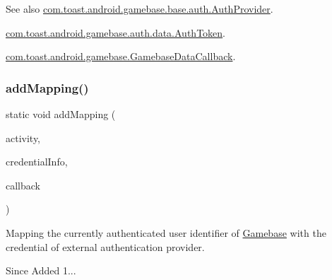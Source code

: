 \begin{DoxySeeAlso}{See also}
\hyperlink{interfacecom_1_1toast_1_1android_1_1gamebase_1_1base_1_1auth_1_1_auth_provider}{com.\+toast.\+android.\+gamebase.\+base.\+auth.\+Auth\+Provider}. 

\hyperlink{classcom_1_1toast_1_1android_1_1gamebase_1_1auth_1_1data_1_1_auth_token}{com.\+toast.\+android.\+gamebase.\+auth.\+data.\+Auth\+Token}. 

\hyperlink{interfacecom_1_1toast_1_1android_1_1gamebase_1_1_gamebase_data_callback}{com.\+toast.\+android.\+gamebase.\+Gamebase\+Data\+Callback}. 
\end{DoxySeeAlso}
\mbox{\label{classcom_1_1toast_1_1android_1_1gamebase_1_1_gamebase_a5152b09c5542e5442ed94f0f541ae1d5}} 
\subsubsection{\texorpdfstring{add\+Mapping()}{addMapping()}\hspace{0.1cm}{\footnotesize\ttfamily [2/3]}}
{\footnotesize\ttfamily static void add\+Mapping (\begin{DoxyParamCaption}\item[{@Non\+Null final Activity}]{activity,  }\item[{@Non\+Null final Map$<$ String, Object $>$}]{credential\+Info,  }\item[{@Nullable final \hyperlink{interfacecom_1_1toast_1_1android_1_1gamebase_1_1_gamebase_data_callback}{Gamebase\+Data\+Callback}$<$ \hyperlink{classcom_1_1toast_1_1android_1_1gamebase_1_1auth_1_1data_1_1_auth_token}{Auth\+Token} $>$}]{callback }\end{DoxyParamCaption})\hspace{0.3cm}{\ttfamily [static]}}



Mapping the currently authenticated user identifier of \hyperlink{classcom_1_1toast_1_1android_1_1gamebase_1_1_gamebase}{Gamebase} with the credential of external authentication provider. 

\begin{DoxySince}{Since}
Added 1... 
\end{DoxySince}

